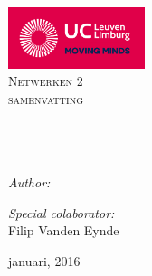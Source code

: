 \begin{titlepage}
\vbox{ }

\vbox{ }

\begin{center}
\includegraphics[width=0.30\textwidth]{./img/logo_ucleuvenlimburg_rgb.png}\\[1cm]
\textsc{\LARGE Netwerken 2}\\[1.5cm]
\textsc{\Large  samenvatting}\\[0.5cm]

\vbox{ }
\HRule \\[0.4cm]
{ \huge \bfseries \thetitle}\\[0.4cm]

\HRule \\[1.5cm]
\begin{minipage}{0.4\textwidth}
\begin{flushleft} \large
\emph{Author:}\\
\theauthor
\end{flushleft}
\end{minipage}
\begin{minipage}{0.4\textwidth}
\begin{flushright} \large
\emph{Special colaborator:} \\
Filip Vanden Eynde
\end{flushright}
\end{minipage}
\vfill
{\large januari, 2016}
\end{center}
\end{titlepage}